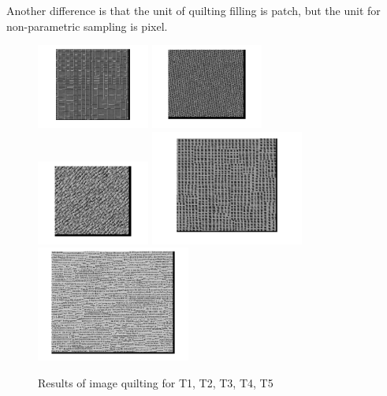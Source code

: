 \documentclass{extarticle}
\theoremstyle{definition}
\theoremstyle{definition}
\begin{document}
Another difference is that the unit of quilting filling is patch, but the unit for non-parametric sampling is pixel.
\begin{figure}[h!]
	\includegraphics[width = 0.33\textwidth]{./figures/Quilting_T1.png}	
	\includegraphics[width = 0.33\textwidth]{./figures/Quilting_T2.png}	
	\includegraphics[width = 0.33\textwidth]{./figures/Quilting_T3.png}
	\includegraphics[width = 0.45\textwidth]{./figures/Quilting_T4.png}
	\includegraphics[width = 0.45\textwidth]{./figures/Quilting_T5.png}	
	\caption{Results of image quilting for T1, T2, T3, T4, T5}
	\label{fig_quilting}
\end{figure}
\end{document}
